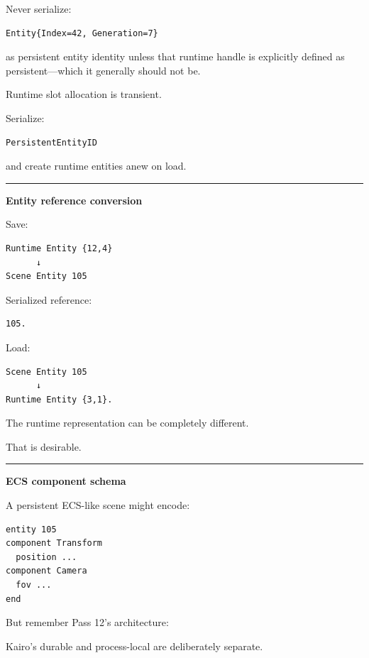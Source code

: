 Never serialize:

\begin{verbatim}
Entity{Index=42, Generation=7}
\end{verbatim}

as persistent entity identity unless that runtime handle is explicitly defined as persistent---which it generally should not be.

Runtime slot allocation is transient.

Serialize:

\begin{verbatim}
PersistentEntityID
\end{verbatim}

and create runtime entities anew on load.

\begin{center}\rule{0.5\linewidth}{0.5pt}\end{center}

\textbf{Entity reference conversion}

Save:

\begin{verbatim}
Runtime Entity {12,4}
      ↓
Scene Entity 105
\end{verbatim}

Serialized reference:

\begin{verbatim}
105.
\end{verbatim}

Load:

\begin{verbatim}
Scene Entity 105
      ↓
Runtime Entity {3,1}.
\end{verbatim}

The runtime representation can be completely different.

That is desirable.

\begin{center}\rule{0.5\linewidth}{0.5pt}\end{center}

\textbf{ECS component schema}

A persistent ECS-like scene might encode:

\begin{verbatim}
entity 105
component Transform
  position ...
component Camera
  fov ...
end
\end{verbatim}

But remember Pass 12's architecture:

Kairo's durable  and process-local  are deliberately separate.

